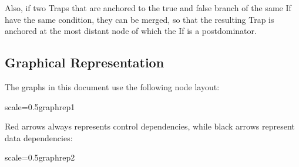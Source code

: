\documentclass[twocolumn]{svjour3}
\begin{document}
Also, if two Traps that are anchored to the true and false branch of the same If have the same condition, they can be merged, so that the resulting Trap is anchored at the most distant node of which the If is a postdominator.

\subsection{Graphical Representation}
The graphs in this document use the following node layout:

\begin{digraphenv}{scale=0.5}{graphrep1}
\end{digraphenv}

Red arrows always represents control dependencies, while black arrows represent data dependencies:

\begin{digraphenv}{scale=0.5}{graphrep2}
\end{digraphenv}
\end{document}
